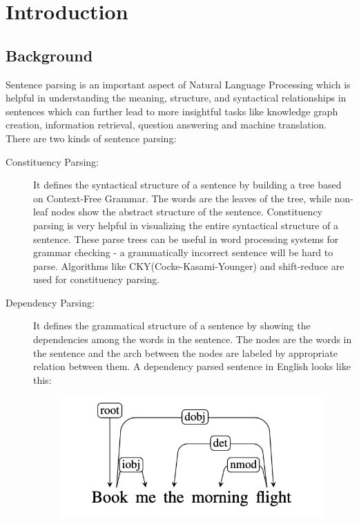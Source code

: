 \chapter{Introduction}

\section{Background}

Sentence parsing is an important aspect of Natural Language Processing which is
helpful in understanding the meaning, structure, and syntactical relationships
in sentences which can further lead to more insightful tasks like knowledge
graph creation, information retrieval, question answering and machine
translation.  There are two kinds of sentence parsing:
\begin{description}
    \item [Constituency Parsing:]
        It defines the syntactical structure of a sentence by building a tree
        based on Context-Free Grammar. The words are the leaves of the tree,
        while non-leaf nodes show the abstract structure of the sentence.
        Constituency parsing is very helpful in visualizing the entire
        syntactical structure of a sentence. These parse trees can be
        useful in word processing systems for grammar checking - a
        grammatically incorrect sentence will be hard to parse. Algorithms like
        CKY(Cocke-Kasami-Younger) and shift-reduce are used for constituency
        parsing.
    \item [Dependency Parsing:]
        It defines the grammatical structure of a sentence by showing the
        dependencies among the words in the sentence. The nodes are the words
        in the sentence and the arch between the nodes are labeled by
        appropriate relation between them. A dependency parsed sentence in English looks like this:
    \begin{figure}[!h]
        \center
        \includegraphics[scale=0.2]{images/dep_tree_eng_example}

\end{figure}
\end{description}

